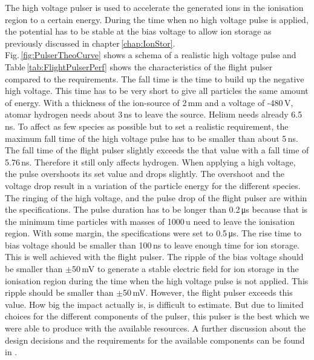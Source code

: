 		The high voltage pulser is used to accelerate the generated ions in the ionisation region to a certain energy. During the time when no high voltage pulse is applied, the potential has to be stable at the bias voltage to allow ion storage as previously discussed in chapter\,\ref{chap:IonStor}.\\ Fig.\,\ref{fig:PulserTheoCurve} shows a schema of a realistic high voltage pulse and Table\,\ref{tab:FlightPulserPerf} shows the characteristics of the flight pulser compared to the requirements. The fall time is the time to build up the negative high voltage. This time has to be very short to give all particles the same amount of energy. With a thickness of the ion-source of 2\,mm and a voltage of -480\,V, atomar hydrogen needs about 3\,ns to leave the source. Helium needs already 6.5\,ns. To affect as few species as possible but to set a realistic requirement, the maximum fall time of the high voltage pulse has to be smaller than about 5\,ns. The fall time of the flight pulser slightly exceeds the that value with a fall time of 5.76\,ns. Therefore it still only affects hydrogen. When applying a high voltage, the pulse overshoots its set value and drops slightly. The overshoot and the voltage drop result in a variation of the particle energy for the different species. The ringing of the high voltage, and the pulse drop of the flight pulser are within the specifications. The pulse duration has to be longer than 0.2\,\si{\micro\second} because that is the minimum time particles with masses of 1000\,u need to leave the ionisation region. With some margin, the specifications were set to 0.5\,\si{\micro\second}. The rise time to bias voltage should be smaller than 100\,ns to leave enough time for ion storage. This is well achieved with the flight pulser. The ripple of the bias voltage should be smaller than $\pm$50\,mV to generate a stable electric field for ion storage in the ionisation region during the time when the high voltage pulse is not applied. This ripple should be smaller than $\pm$50\,mV. However, the flight pulser exceeds this value. How big the impact actually is, is difficult to estimate. But due to limited choices for the different components of the pulser, this pulser is the best which we were able to produce with the available resources. A further discussion about the design decisions and the requirements for the available components can be found in \cite{Lasi_IEEE2020}.\\
